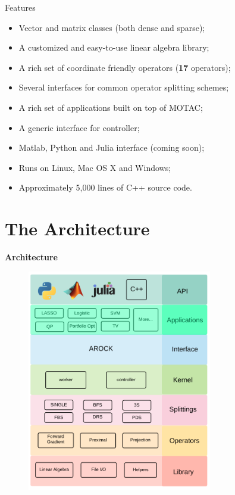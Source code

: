 \documentclass[hyperref,handout,compress,9pt,mathserif]{beamer}
\begin{document}
\begin{frame}{Features}
\begin{itemize}
\item Vector and matrix classes (both dense and sparse);
\item A customized and easy-to-use linear algebra library; 
\item A rich set of coordinate friendly operators (\textbf{17} operators);
\item Several interfaces for common operator splitting schemes; 
\item A rich set of applications built on top of MOTAC;
\item A generic interface for controller;
\item Matlab, Python and Julia interface (coming soon);
\item Runs on Linux, Mac OS X and Windows;
\item Approximately 5,000 lines of C++ source code.
\end{itemize}
\end{frame}

\section{The Architecture}
\begin{frame}\begin{center}\begin{Large}\textbf{Architecture}\end{Large}\end{center}\end{frame}

\begin{frame}
\begin{figure}[!h]
        \centering
                \includegraphics[width=0.72\textwidth]{./figs/architecture}
\end{figure}
\end{frame}
\end{document}
